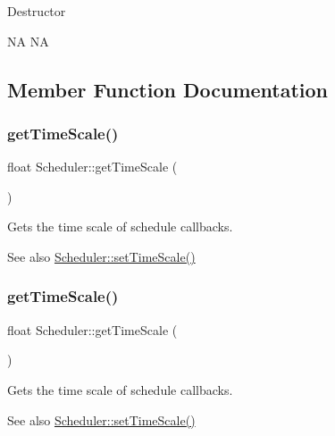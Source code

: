 Destructor

NA  NA 

\subsection{Member Function Documentation}
\mbox{\label{classScheduler_a2ec13a52fa6a75450f17f122444069a9}} 
\subsubsection{\texorpdfstring{get\+Time\+Scale()}{getTimeScale()}\hspace{0.1cm}{\footnotesize\ttfamily [1/2]}}
{\footnotesize\ttfamily float Scheduler\+::get\+Time\+Scale (\begin{DoxyParamCaption}{ }\end{DoxyParamCaption})\hspace{0.3cm}{\ttfamily [inline]}}

Gets the time scale of schedule callbacks. \begin{DoxySeeAlso}{See also}
\hyperlink{classScheduler_a7aeaef587604d3a1f20ebac7a12b1d77}{Scheduler\+::set\+Time\+Scale()} 
\end{DoxySeeAlso}
\mbox{\label{classScheduler_a2ec13a52fa6a75450f17f122444069a9}} 
\subsubsection{\texorpdfstring{get\+Time\+Scale()}{getTimeScale()}\hspace{0.1cm}{\footnotesize\ttfamily [2/2]}}
{\footnotesize\ttfamily float Scheduler\+::get\+Time\+Scale (\begin{DoxyParamCaption}{ }\end{DoxyParamCaption})\hspace{0.3cm}{\ttfamily [inline]}}

Gets the time scale of schedule callbacks. \begin{DoxySeeAlso}{See also}
\hyperlink{classScheduler_a7aeaef587604d3a1f20ebac7a12b1d77}{Scheduler\+::set\+Time\+Scale()} 
\end{DoxySeeAlso}
\mbox{\label{classScheduler_a57e1ce8ec29f360c27d82d91028b23a5}} 

